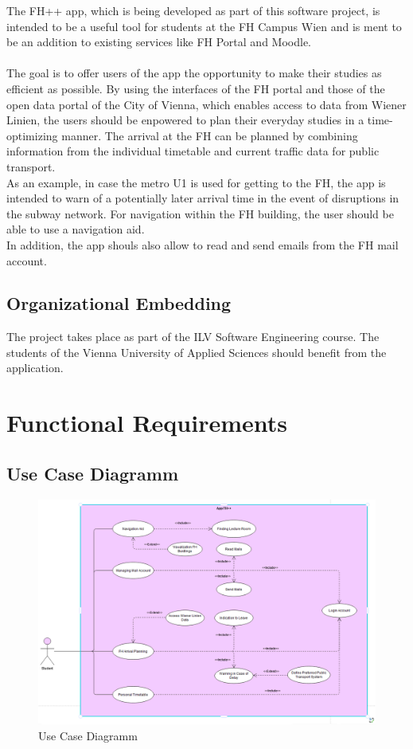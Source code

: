 \documentclass{scrreprt}
\begin{document}
The FH++ app, which is being developed as part of this software project, is intended to be a useful tool for students at the FH Campus Wien and is ment to be an addition to existing services like FH Portal and Moodle. \\ \\
The goal is to offer users of the app the opportunity to make their studies as efficient as possible.
By using the interfaces of the FH portal and those of the open data portal of the City of Vienna, which enables access to data from Wiener Linien,
the users should be enpowered to plan their everyday studies in a time-optimizing manner.
The arrival at the FH can be planned by combining information from the individual timetable and current traffic data for public transport. \\
As an example, in case the metro U1 is used for getting to the FH, the app is intended to warn of a potentially later arrival time in the event of disruptions in the subway network.
For navigation within the FH building, the user should be able to use a navigation aid. \\
In addition, the app shouls also allow to read and send emails from the FH mail account.

\section{Organizational Embedding}
The project takes place as part of the ILV Software Engineering course. The students of the Vienna University of Applied Sciences should benefit from the application.

\chapter{Functional Requirements}

\section{Use Case Diagramm}

\begin{figure} [h]
	\centering
	\includegraphics[width=1\linewidth]{pics/usecasediagram}
	\caption{Use Case Diagramm}
	\label{fig:usecasediagram}
\end{figure}
\end{document}

